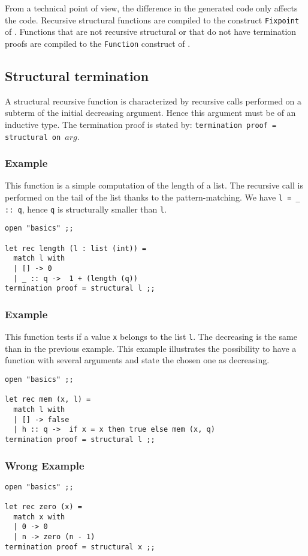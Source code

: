 From a technical point of view, the difference in the generated code only
affects the {\coq} code. Recursive structural functions are compiled to the
construct {\tt Fixpoint} of {\coq}. Functions that are not recursive
structural or that do not have termination proofs are compiled to the
{\tt Function} construct of {\coq}.


\subsection{Structural termination}
A structural recursive function is characterized by recursive calls performed
on a subterm of the initial decreasing argument. Hence this argument must be of
an inductive type. The termination proof is stated by:
{\tt termination proof = structural on $arg$}.

\subsubsection{Example}
This function is a simple computation of the length of a list. The recursive
call is performed on the tail of the list thanks to the pattern-matching.
We have {\tt l = \_ :: q}, hence {\tt q} is structurally smaller than
{\tt l}.

\noindent
{\scriptsize
\begin{lstlisting}
open "basics" ;;

let rec length (l : list (int)) =
  match l with
  | [] -> 0
  | _ :: q ->  1 + (length (q))
termination proof = structural l ;;
\end{lstlisting}
}

\subsubsection{Example}
This function tests if a value {\tt x} belongs to the list {\tt l}. The
decreasing is the same than in the previous example. This example illustrates
the possibility to have a function with several arguments and state the
chosen one as decreasing.

{\scriptsize
\begin{lstlisting}
open "basics" ;;

let rec mem (x, l) =
  match l with
  | [] -> false
  | h :: q ->  if x = x then true else mem (x, q)
termination proof = structural l ;;
\end{lstlisting}
}

\subsubsection{{\bf Wrong} Example}
\noindent
{\scriptsize
\begin{lstlisting}
open "basics" ;;

let rec zero (x) =
  match x with
  | 0 -> 0
  | n -> zero (n - 1)
termination proof = structural x ;;
\end{lstlisting}
}

